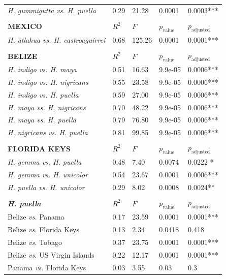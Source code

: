 \begin{xltabular}{\textwidth}{p{5cm}*{4}{X}}
    \emph{H. gummigutta vs. H. puella} & 0.29 & 21.28 & 0.0001 & 0.0003*** \\ \\
    \hline \hline
    \textbf{MEXICO} & $R^2$ & $F$ & $p_{\text{value}}$ & $p_{\text{adjusted}}$\\
    \hline
    \hline
    \emph{H. atlahua vs. H. castroaguirrei} & 0.68 & 125.26 & 0.0001 & 0.0001*** \\ \\
    \hline \hline
    \textbf{BELIZE} & $R^2$ & $F$ & $p_{\text{value}}$ & $p_{\text{adjusted}}$\\
    \hline
    \hline
    \emph{H. indigo vs. H. maya} & 0.51 & 16.63 & 9.9e-05 & 0.0006*** \\
    \emph{H. indigo vs. H. nigricans} & 0.55 & 23.58 & 9.9e-05 & 0.0006*** \\
    \emph{H. indigo vs. H. puella} & 0.59 & 27.00 & 9.9e-05 & 0.0006*** \\
    \emph{H. maya vs. H. nigricans} & 0.70 &  48.22 & 9.9e-05 & 0.0006*** \\
    \emph{H. maya vs. H. puella} & 0.79 & 76.80 & 9.9e-05 & 0.0006*** \\
    \emph{H. nigricans vs. H. puella} & 0.81 & 99.85 & 9.9e-05 & 0.0006*** \\ \\
    \hline \hline
    \textbf{FLORIDA KEYS} & $R^2$ & $F$ & $p_{\text{value}}$ & $p_{\text{adjusted}}$\\
    \hline
    \hline
    \emph{H. gemma vs. H. puella} & 0.48 & 7.40 & 0.0074 & 0.0222
    * \\
    \emph{H. gemma vs. H. unicolor} & 0.54 & 23.67 & 0.0001 & 0.0006*** \\
    \emph{H. puella vs. H. unicolor} & 0.29 & 8.02 & 0.0008 & 0.0024** \\ \\
    \hline \hline
    \textbf{\emph{H. puella}} & $R^2$ & $F$ & $p_{\text{value}}$ & $p_{\text{adjusted}}$\\
    \hline
    \hline
    Belize \emph{vs.} Panama & 0.17 & 23.59 & 0.0001 & 0.0001*** \\
    Belize \emph{vs.} Florida Keys & 0.13 & 2.34 & 0.0418 & 0.418 \\
    Belize \emph{vs.} Tobago & 0.37 & 23.75 & 0.0001 & 0.0001*** \\
    Belize \emph{vs.} US Virgin Islands & 0.22 & 12.17 & 0.0001 & 0.0001*** \\
    Panama \emph{vs.} Florida Keys & 0.03 & 3.55 & 0.03 & 0.3 \\

\end{xltabular}
